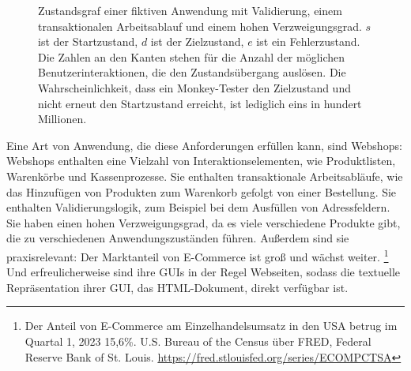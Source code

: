 \begin{figure}
    \centering
    \caption{Zustandsgraf einer fiktiven Anwendung mit Validierung, einem transaktionalen Arbeitsablauf und einem hohen Verzweigungsgrad. $s$ ist der Startzustand, $d$ ist der Zielzustand, $e$ ist ein Fehlerzustand. Die Zahlen an den Kanten stehen für die Anzahl der möglichen Benutzerinteraktionen, die den Zustandsübergang auslösen. Die Wahrscheinlichkeit, dass ein Monkey-Tester den Zielzustand und nicht erneut den Startzustand erreicht, ist lediglich eins in hundert Millionen.}
    \label{fig:sad_monkey}
\end{figure}

Eine Art von Anwendung, die diese Anforderungen erfüllen kann, sind Webshops:
Webshops enthalten eine Vielzahl von Interaktionselementen, wie Produktlisten, Warenkörbe und Kassenprozesse.
Sie enthalten transaktionale Arbeitsabläufe, wie das Hinzufügen von Produkten zum Warenkorb gefolgt von einer Bestellung.
Sie enthalten Validierungslogik, zum Beispiel bei dem Ausfüllen von Adressfeldern.
Sie haben einen hohen Verzweigungsgrad, da es viele verschiedene Produkte gibt, die zu verschiedenen Anwendungszuständen führen.
Außerdem sind sie praxisrelevant: Der Marktanteil von E-Commerce ist groß und wächst weiter.
\footnote{
Der Anteil von E-Commerce am Einzelhandelsumsatz in den USA betrug im Quartal 1, 2023 15,6\%. U.S. Bureau of the Census über FRED, Federal Reserve Bank of St. Louis. \url{https://fred.stlouisfed.org/series/ECOMPCTSA}}
Und erfreulicherweise sind ihre GUIs in der Regel Webseiten, sodass die textuelle Repräsentation ihrer GUI, das HTML-Dokument, direkt verfügbar ist.

